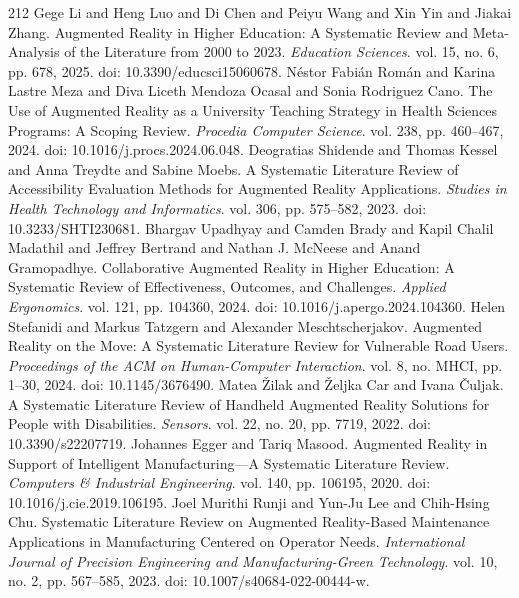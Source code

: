 \begin{thebibliography}{212}
 Gege Li and Heng Luo and Di Chen and Peiyu Wang and Xin Yin and Jiakai Zhang. Augmented Reality in Higher Education: A Systematic Review and Meta-Analysis of the Literature from 2000 to 2023. \emph{Education Sciences}. vol. 15, no. 6, pp. 678, 2025. doi: 10.3390/educsci15060678.
 N{\'e}stor Fabi{\'a}n Rom{\'a}n and Karina Lastre Meza and Diva Liceth Mendoza Ocasal and Sonia Rodriguez Cano. The Use of Augmented Reality as a University Teaching Strategy in Health Sciences Programs: A Scoping Review. \emph{Procedia Computer Science}. vol. 238, pp. 460--467, 2024. doi: 10.1016/j.procs.2024.06.048.
 Deogratias Shidende and Thomas Kessel and Anna Treydte and Sabine Moebs. A Systematic Literature Review of Accessibility Evaluation Methods for Augmented Reality Applications. \emph{Studies in Health Technology and Informatics}. vol. 306, pp. 575--582, 2023. doi: 10.3233/SHTI230681.
 Bhargav Upadhyay and Camden Brady and Kapil Chalil Madathil and Jeffrey Bertrand and Nathan J. McNeese and Anand Gramopadhye. Collaborative Augmented Reality in Higher Education: A Systematic Review of Effectiveness, Outcomes, and Challenges. \emph{Applied Ergonomics}. vol. 121, pp. 104360, 2024. doi: 10.1016/j.apergo.2024.104360.
 Helen Stefanidi and Markus Tatzgern and Alexander Meschtscherjakov. Augmented Reality on the Move: A Systematic Literature Review for Vulnerable Road Users. \emph{Proceedings of the ACM on Human-Computer Interaction}. vol. 8, no. MHCI, pp. 1--30, 2024. doi: 10.1145/3676490.
 Matea {\v{Z}}ilak and {\v{Z}}eljka Car and Ivana {\v{C}}uljak. A Systematic Literature Review of Handheld Augmented Reality Solutions for People with Disabilities. \emph{Sensors}. vol. 22, no. 20, pp. 7719, 2022. doi: 10.3390/s22207719.
 Johannes Egger and Tariq Masood. Augmented Reality in Support of Intelligent Manufacturing---A Systematic Literature Review. \emph{Computers \& Industrial Engineering}. vol. 140, pp. 106195, 2020. doi: 10.1016/j.cie.2019.106195.
 Joel Murithi Runji and Yun-Ju Lee and Chih-Hsing Chu. Systematic Literature Review on Augmented Reality-Based Maintenance Applications in Manufacturing Centered on Operator Needs. \emph{International Journal of Precision Engineering and Manufacturing-Green Technology}. vol. 10, no. 2, pp. 567--585, 2023. doi: 10.1007/s40684-022-00444-w.

\end{thebibliography}
